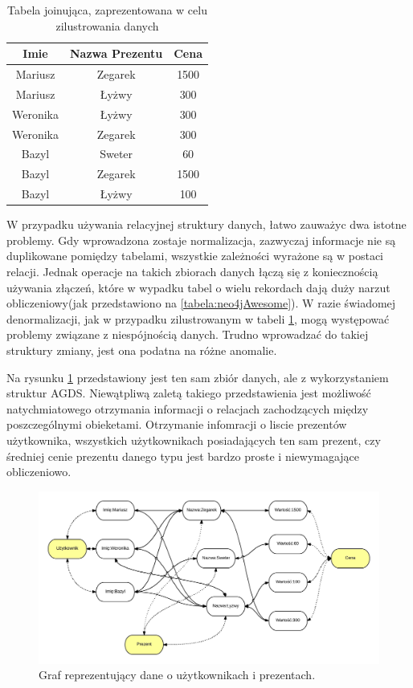 \begin{table}
\label{tabela:join}
    \centering
    \caption{Tabela joinująca, zaprezentowana w celu zilustrowania danych}
    \begin{tabular}{| c | c | c |}
        \hline
        Imie & Nazwa Prezentu & Cena \\
        \hline
        Mariusz & Zegarek & 1500 \\
        \hline
        Mariusz & Łyżwy & 300 \\
        \hline
        Weronika & Łyżwy & 300 \\
        \hline
        Weronika & Zegarek & 300 \\
        \hline
        Bazyl & Sweter & 60 \\
        \hline
        Bazyl & Zegarek & 1500 \\
        \hline
        Bazyl & Łyżwy & 100 \\
        \hline
    \end{tabular}

\end{table}

W przypadku używania relacyjnej struktury danych, łatwo zauważyc dwa istotne problemy. Gdy wprowadzona zostaje normalizacja, zazwyczaj informacje nie są duplikowane pomiędzy
tabelami, wszystkie zależności wyrażone są w postaci relacji. Jednak operacje na takich zbiorach danych łączą się z koniecznością używania złączeń, które w wypadku
tabel o wielu rekordach dają duży narzut obliczeniowy(jak przedstawiono na \ref{tabela:neo4jAwesome}). W razie świadomej denormalizacji, jak w przypadku zilustrowanym w tabeli
\ref{tabela:join}, mogą występować problemy związane z niespójnością danych. Trudno wprowadzać do takiej struktury zmiany, jest ona podatna na różne anomalie.

Na rysunku \ref{graph:agds} przedstawiony jest ten sam zbiór danych, ale z wykorzystaniem struktur AGDS. Niewątpliwą zaletą takiego przedstawienia jest możliwość natychmiatowego
otrzymania informacji o relacjach zachodzących między poszczególnymi obieketami. Otrzymanie infomracji o liscie prezentów użytkownika, wszystkich użytkownikach posiadających
ten sam prezent, czy średniej cenie prezentu danego typu jest bardzo proste i niewymagające obliczeniowo.

\begin{figure}[!h]
    \label{graph:agds}
    \includegraphics[width=\textwidth]{agds}
    \caption{Graf reprezentujący dane o użytkownikach i prezentach.}
\end{figure}

